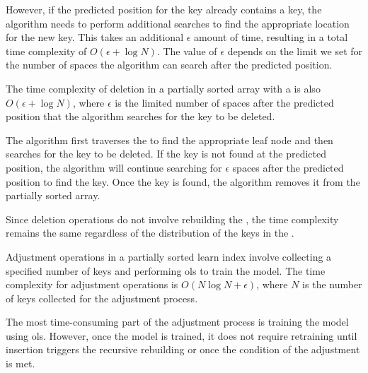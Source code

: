 However, if the predicted position for the key already contains a key, the algorithm needs to perform additional searches to find the appropriate location for the new key. This takes an additional $\epsilon$ amount of time, resulting in a total time complexity of $O(\epsilon + \log N)$. The value of $\epsilon$ depends on the limit we set for the number of spaces the algorithm can search after the predicted position. 

The time complexity of deletion in a partially sorted array with a \learnindex is also $O(\epsilon + \log N)$, where $\epsilon$ is the limited number of spaces after the predicted position that the algorithm searches for the key to be deleted.

The algorithm first traverses the \learnindex to find the appropriate leaf node and then searches for the key to be deleted. If the key is not found at the predicted position, the algorithm will continue searching for $\epsilon$ spaces after the predicted position to find the key. Once the key is found, the algorithm removes it from the partially sorted array.

Since deletion operations do not involve rebuilding the \learnindex, the time complexity remains the same regardless of the distribution of the keys in the \learnindex.

Adjustment operations in a partially sorted learn index involve collecting a specified number of keys and performing \acrshort{ols} to train the model. The time complexity for adjustment operations is $O(N\log N + \epsilon)$, where $N$ is the number of keys collected for the adjustment process.

The most time-consuming part of the adjustment process is training the model using \acrshort{ols}. However, once the model is trained, it does not require retraining until insertion triggers the recursive rebuilding or once the condition of the adjustment is met. 
